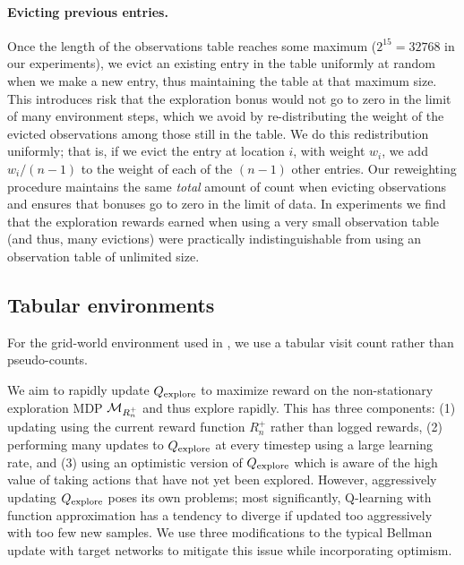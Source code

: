 \paragraph{Evicting previous entries.}
Once the length of the observations table reaches some maximum ($2^{15} = 32768$ in our experiments), we evict an existing entry in the table uniformly at random when we make a new entry, thus maintaining the table at that maximum size.
This introduces risk that the exploration bonus would not go to zero in the limit of many environment steps, which we avoid by re-distributing the weight of the evicted observations among those still in the table.
We do this redistribution uniformly; that is, if we evict the entry at location $i$, with weight $w_i$, we add $w_i / (n-1)$ to the weight of each of the $(n-1)$ other entries.
Our reweighting procedure maintains the same \emph{total} amount of count when evicting observations and ensures that bonuses go to zero in the limit of data.
In experiments we find that the exploration rewards earned when using a very small observation table (and thus, many evictions) were practically indistinguishable from using an observation table of unlimited size.


\subsection{Tabular environments}
For the grid-world environment used in , we use a tabular visit count rather than pseudo-counts.


 \label{sec:fast_updates_appendix}

We aim to rapidly update $Q_{\text{explore}}$ to maximize reward on the non-stationary exploration MDP $\mathcal{M}_{R^+_n}$ and thus explore rapidly.
This has three components: (1) updating using the current reward function $R^+_n$ rather than logged rewards, (2) performing many updates to $Q_{\text{explore}}$ at every timestep using a large learning rate, and (3) using an optimistic version of $Q_{\text{explore}}$ which is aware of the high value of taking actions that have not yet been explored.
However, aggressively updating $Q_{\text{explore}}$ poses its own problems; most significantly, Q-learning with function approximation has a tendency to diverge if updated too aggressively with too few new samples.
We use three modifications to the typical Bellman update with target networks \citep{mnih2015human} to mitigate this issue while incorporating optimism.

